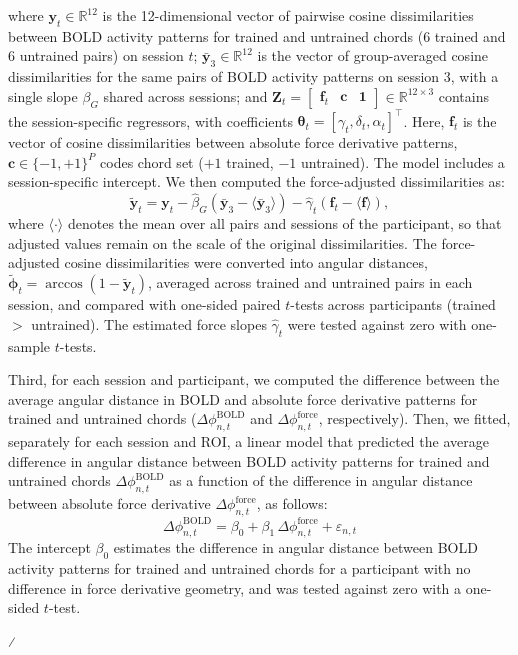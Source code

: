\documentclass{article}
\begin{document}
where $\mathbf{y}_t \in \mathbb{R}^{12}$ is the 12-dimensional vector of pairwise cosine dissimilarities between BOLD activity patterns for trained and untrained chords (6 trained and 6 untrained pairs) on session $t$; $\bar{\mathbf{y}}_3 \in \mathbb{R}^{12}$ is the vector of group-averaged cosine dissimilarities for the same pairs of BOLD activity patterns on session 3, with a single slope $\beta_G$ shared across sessions; and $\mathbf{Z}_t = \begin{bmatrix} \mathbf{f}_t & \mathbf{c} & \mathbf{1} \end{bmatrix} \in \mathbb{R}^{12 \times 3}$ contains the session-specific regressors, with coefficients $\boldsymbol{\theta}_t = [\gamma_t, \delta_t, \alpha_t]^\top$. Here, $\mathbf{f}_t$ is the vector of cosine dissimilarities between absolute force derivative patterns, $\mathbf{c} \in \{-1, +1\}^{P}$ codes chord set ($+1$ trained, $-1$ untrained). The model includes a session-specific intercept. We then computed the force-adjusted dissimilarities as:
\begin{equation}
    \tilde{\mathbf{y}}_t = \mathbf{y}_t - \hat{\beta}_G\left(\bar{\mathbf{y}}_3 - \langle \bar{\mathbf{y}}_3 \rangle\right) - \hat{\gamma}_t\left(\mathbf{f}_t - \langle \mathbf{f} \rangle\right),
\end{equation}
where $\langle\cdot\rangle$ denotes the mean over all pairs and sessions of the participant, so that adjusted values remain on the scale of the original dissimilarities. The force-adjusted cosine dissimilarities were converted into angular distances, $\tilde{\boldsymbol{\phi}}_t = \arccos(1 - \tilde{\mathbf{y}}_t)$, averaged across trained and untrained pairs in each session, and compared with one-sided paired $t$-tests across participants (trained $>$ untrained). The estimated force slopes $\hat{\gamma}_t$ were tested against zero with one-sample $t$-tests.

Third, for each session and participant, we computed the difference between the average angular distance in BOLD and absolute force derivative patterns for trained and untrained chords ($\Delta\phi^{\mathrm{BOLD}}_{n,t}$ and $\Delta\phi^{\mathrm{force}}_{n,t}$, respectively). Then, we fitted, separately for each session and ROI, a linear model that predicted the average difference in angular distance between BOLD activity patterns for trained and untrained chords $\Delta\phi^{\mathrm{BOLD}}_{n,t}$ as a function of the difference in angular distance between absolute force derivative $\Delta\phi^{\mathrm{force}}_{n,t}$, as follows:
\begin{equation}
    \Delta\phi^{\mathrm{BOLD}}_{n,t} = \beta_0 + \beta_1\,\Delta\phi^{\mathrm{force}}_{n,t} + \varepsilon_{n,t}
\end{equation}
The intercept $\beta_0$ estimates the difference in angular distance between BOLD activity patterns for trained and untrained chords for a participant with no difference in force derivative geometry, and was tested against zero with a one-sided $t$-test.

⁄
\end{document}
